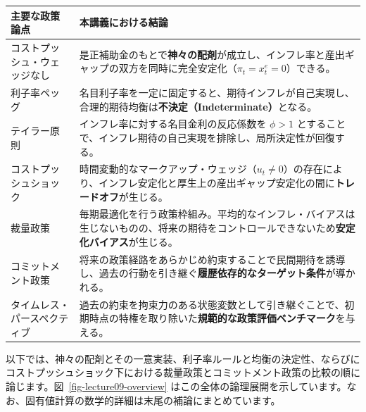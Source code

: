 \documentclass[
  japanese,
  lualatex,
  ja=standard,
  12pt,
  a4paper]{ltjsarticle}
\newcounter{none} %
\begin{document}
{\def\LTcaptype{none} %
\begin{longtable}[]{@{}
  >{\raggedright\arraybackslash}p{}
  >{\raggedright\arraybackslash}p{}@{}}
\toprule\noalign{}
\begin{minipage}[b]{\linewidth}\raggedright
主要な政策論点
\end{minipage} & \begin{minipage}[b]{\linewidth}\raggedright
本講義における結論
\end{minipage} \\
\midrule\noalign{}
\endhead
\bottomrule\noalign{}
\endlastfoot
コストプッシュ・ウェッジなし &
是正補助金のもとで\textbf{神々の配剤}が成立し、インフレ率と産出ギャップの双方を同時に完全安定化（\(\pi_t=x_t^e=0\)）できる。 \\
利子率ペッグ &
名目利子率を一定に固定すると、期待インフレが自己実現し、合理的期待均衡は\textbf{不決定（Indeterminate）}となる。 \\
テイラー原則 & インフレ率に対する名目金利の反応係数を \(\phi>1\)
とすることで、インフレ期待の自己実現を排除し、局所決定性が回復する。 \\
コストプッシュショック &
時間変動的なマークアップ・ウェッジ（\(u_t \neq 0\)）の存在により、インフレ安定化と厚生上の産出ギャップ安定化の間に\textbf{トレードオフ}が生じる。 \\
裁量政策 &
毎期最適化を行う政策枠組み。平均的なインフレ・バイアスは生じないものの、将来の期待をコントロールできないため\textbf{安定化バイアス}が生じる。 \\
コミットメント政策 &
将来の政策経路をあらかじめ約束することで民間期待を誘導し、過去の行動を引き継ぐ\textbf{履歴依存的なターゲット条件}が導かれる。 \\
タイムレス・パースペクティブ &
過去の約束を拘束力のある状態変数として引き継ぐことで、初期時点の特権を取り除いた\textbf{規範的な政策評価ベンチマーク}を与える。 \\
\end{longtable}
}

以下では、神々の配剤とその一意実装、利子率ルールと均衡の決定性、ならびにコストプッシュショック下における裁量政策とコミットメント政策の比較の順に論じます。図~\ref{fig-lecture09-overview}
はこの全体の論理展開を示しています。なお、固有値計算の数学的詳細は末尾の補論にまとめています。
\end{document}
